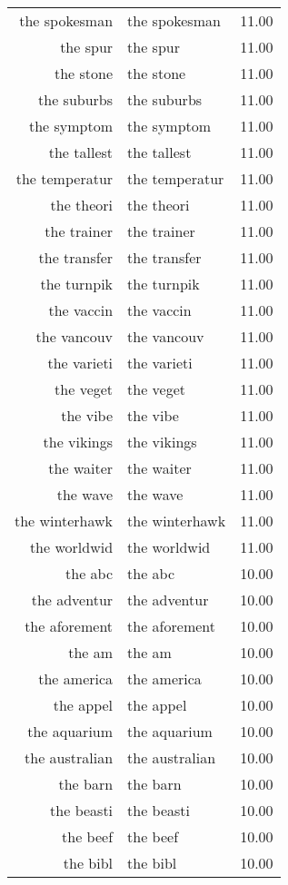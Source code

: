 \begin{table}[ht]
\begin{tabular}{rlr}
  the spokesman & the spokesman & 11.00 \\ 
  the spur & the spur & 11.00 \\ 
  the stone & the stone & 11.00 \\ 
  the suburbs & the suburbs & 11.00 \\ 
  the symptom & the symptom & 11.00 \\ 
  the tallest & the tallest & 11.00 \\ 
  the temperatur & the temperatur & 11.00 \\ 
  the theori & the theori & 11.00 \\ 
  the trainer & the trainer & 11.00 \\ 
  the transfer & the transfer & 11.00 \\ 
  the turnpik & the turnpik & 11.00 \\ 
  the vaccin & the vaccin & 11.00 \\ 
  the vancouv & the vancouv & 11.00 \\ 
  the varieti & the varieti & 11.00 \\ 
  the veget & the veget & 11.00 \\ 
  the vibe & the vibe & 11.00 \\ 
  the vikings & the vikings & 11.00 \\ 
  the waiter & the waiter & 11.00 \\ 
  the wave & the wave & 11.00 \\ 
  the winterhawk & the winterhawk & 11.00 \\ 
  the worldwid & the worldwid & 11.00 \\ 
  the abc & the abc & 10.00 \\ 
  the adventur & the adventur & 10.00 \\ 
  the aforement & the aforement & 10.00 \\ 
  the am & the am & 10.00 \\ 
  the america & the america & 10.00 \\ 
  the appel & the appel & 10.00 \\ 
  the aquarium & the aquarium & 10.00 \\ 
  the australian & the australian & 10.00 \\ 
  the barn & the barn & 10.00 \\ 
  the beasti & the beasti & 10.00 \\ 
  the beef & the beef & 10.00 \\ 
  the bibl & the bibl & 10.00 \\ 

\end{tabular}
\end{table}
